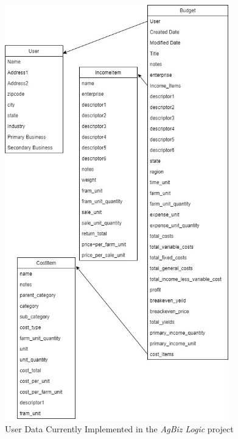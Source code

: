 \documentclass[onecolumn, draftclsnofoot,10pt, compsoc]{article}
\begin{document}
		\begin{figure}[htb]
			\begin{center}
				\includegraphics[width=275pt]{UMLDiagrams/UserData.jpg}
			\end{center}
			\caption{User Data Currently Implemented in the \textit{AgBiz Logic} project}
			\label{fig:UD1}
		\end{figure}
\clearpage
\end{document}
